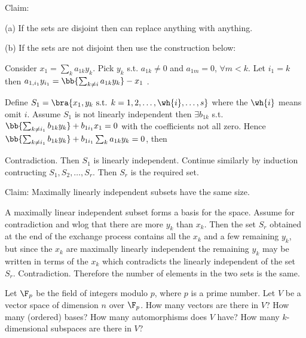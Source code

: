 \begin{solution}[\bf Solution.]
Claim:
\ben
\item [(a)] If the sets are disjoint then can replace anything with anything.
\item [(b)] If the sets are not disjoint then use the construction below:

Consider $x_1 = \sum_k a_{1k}y_k$. Pick $y_k$ s.t. $a_{1k} \neq 0$ and $a_{1m} =0$, $\forall m <k$. Let $i_1 = k$ then $a_{1,i_1}y_{i_1} = \bb{\sum_{k\neq i}a_{1k}y_k} - x_1$ .

Define $S_1 = \bra{x_1,y_k \text{ s.t. }k = 1,2,\dots, \wh{i},\dots,s}$ where the $\wh{i}$ means omit $i$. Assume $S_1$ is not linearly independent then $\exists b_{1k}$ s.t. $\bb{\sum_{k\neq i_1} b_{1k}y_k} + b_{1i_1} x_1 = 0$ with the coefficients not all zero. Hence $\bb{\sum_{k\neq i_1} b_{1k}y_k} + b_{1i_1} \sum_k a_{1k} y_k = 0$, then
\be
{} 
\ee

Contradiction. Then $S_1$ is linearly independent. Continue similarly by induction contructing $S_1,S_2,\dots,S_r$. Then $S_r$ is the required set.
\een

Claim: Maximally linearly independent subsets have the same size.

A maximally linear independent subset forms a basis for the space. Assume for contradiction and wlog that there are more $y_k$ than $x_k$. Then the set $S_r$ obtained at the end of the exchange process contains all the $x_k$ and a few remaining $y_k$, but since the $x_k$ are maximally linearly independent the remaining $y_k$ may be written in terms of the $x_k$ which contradicts the linearly independent of the set $S_r$. Contradiction. Therefore the number of elements in the two sets is the same.
\end{solution}


\begin{problem}
Let $\F_p$ be the field of integers modulo $p$, where $p$ is a prime number. Let $V$ be a vector space of dimension $n$ over $\F_p$. How many vectors are there in $V$? How many (ordered) bases? How many automorphisms does $V$ have? How many $k$-dimensional subspaces are there in $V$?
\end{problem}

